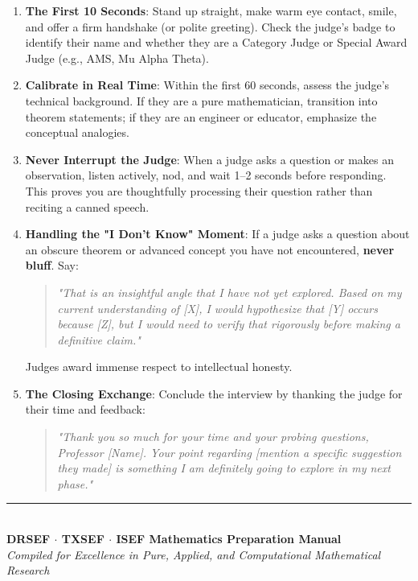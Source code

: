 \documentclass[11pt,letterpaper]{article}
\begin{document}
\begin{enumerate}[leftmargin=*]
    \item \textbf{The First 10 Seconds}: Stand up straight, make warm eye contact, smile, and offer a firm handshake (or polite greeting). Check the judge's badge to identify their name and whether they are a Category Judge or Special Award Judge (e.g., AMS, Mu Alpha Theta).
    \item \textbf{Calibrate in Real Time}: Within the first 60 seconds, assess the judge's technical background. If they are a pure mathematician, transition into theorem statements; if they are an engineer or educator, emphasize the conceptual analogies.
    \item \textbf{Never Interrupt the Judge}: When a judge asks a question or makes an observation, listen actively, nod, and wait 1--2 seconds before responding. This proves you are thoughtfully processing their question rather than reciting a canned speech.
    \item \textbf{Handling the "I Don't Know" Moment}: If a judge asks a question about an obscure theorem or advanced concept you have not encountered, \textbf{never bluff}. Say:
    \begin{quote}
    \textit{"That is an insightful angle that I have not yet explored. Based on my current understanding of [X], I would hypothesize that [Y] occurs because [Z], but I would need to verify that rigorously before making a definitive claim."}
    \end{quote}
    Judges award immense respect to intellectual honesty.
    \item \textbf{The Closing Exchange}: Conclude the interview by thanking the judge for their time and feedback:
    \begin{quote}
    \textit{"Thank you so much for your time and your probing questions, Professor [Name]. Your point regarding [mention a specific suggestion they made] is something I am definitely going to explore in my next phase."}
    \end{quote}
\end{enumerate}

\vspace{2em}
\begin{center}
\rule{0.6\textwidth}{0.8pt} \\
\vspace{0.8em}
\textbf{\color{primaryblue}DRSEF $\cdot$ TXSEF $\cdot$ ISEF Mathematics Preparation Manual} \\
\textit{Compiled for Excellence in Pure, Applied, and Computational Mathematical Research}
\end{center}
\end{document}
